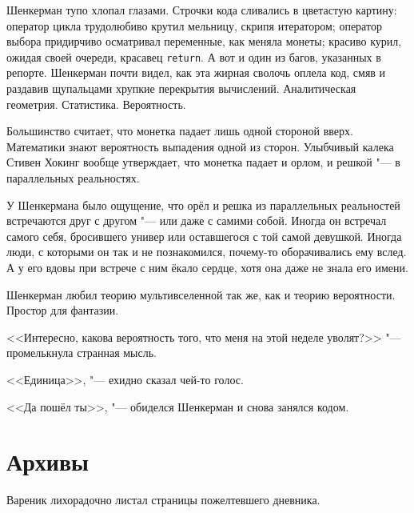 Шенкерман тупо хлопал глазами.
Строчки кода сливались в цветастую картину: оператор цикла трудолюбиво крутил мельницу, скрипя итератором;
оператор выбора придирчиво осматривал переменные, как меняла монеты;
красиво курил, ожидая своей очереди, красавец \verb|return|.
А вот и один из багов, указанных в репорте.
Шенкерман почти видел, как эта жирная сволочь оплела код, смяв и раздавив щупальцами хрупкие перекрытия вычислений.
Аналитическая геометрия.
Статистика.
Вероятность.

Большинство считает, что монетка падает лишь одной стороной вверх.
Математики знают вероятность выпадения одной из сторон.
Улыбчивый калека Стивен Хокинг вообще утверждает, что монетка падает и орлом, и решкой "--- в параллельных реальностях.

У Шенкермана было ощущение, что орёл и решка из параллельных реальностей встречаются друг с другом "--- или даже с самими собой.
Иногда он встречал самого себя, бросившего универ или оставшегося с той самой девушкой.
Иногда люди, с которыми он так и не познакомился, почему-то оборачивались ему вслед.
А у его вдовы при встрече с ним ёкало сердце, хотя она даже не знала его имени.

Шенкерман любил теорию мультивселенной так же, как и теорию вероятности.
Простор для фантазии.

<<Интересно, какова вероятность того, что меня на этой неделе уволят?>> "--- промелькнула странная мысль.

<<Единица>>, "--- ехидно сказал чей-то голос.

<<Да пошёл ты>>, "--- обиделся Шенкерман и снова занялся кодом.

\section{Архивы}

Вареник лихорадочно листал страницы пожелтевшего дневника.

